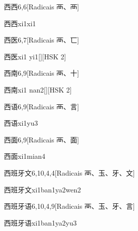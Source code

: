 \begin{entry}{西西}{6,6}[Radicais ⾑、⾑]
  \begin{phonetics}{西西}{xi1xi1}
  \end{phonetics}
\end{entry}

\begin{entry}{西医}{6,7}[Radicais ⾑、⼖]
  \begin{phonetics}{西医}{xi1 yi1}[][HSK 2]
  \end{phonetics}
\end{entry}

\begin{entry}{西南}{6,9}[Radicais ⾑、⼗]
  \begin{phonetics}{西南}{xi1 nan2}[][HSK 2]
  \end{phonetics}
\end{entry}

\begin{entry}{西语}{6,9}[Radicais ⾑、⾔]
  \begin{phonetics}{西语}{xi1yu3}
  \end{phonetics}
\end{entry}

\begin{entry}{西面}{6,9}[Radicais ⾑、⾯]
  \begin{phonetics}{西面}{xi1mian4}
  \end{phonetics}
\end{entry}

\begin{entry}{西班牙文}{6,10,4,4}[Radicais ⾑、⽟、⽛、⽂]
  \begin{phonetics}{西班牙文}{xi1ban1ya2wen2}
  \end{phonetics}
\end{entry}

\begin{entry}{西班牙语}{6,10,4,9}[Radicais ⾑、⽟、⽛、⾔]
  \begin{phonetics}{西班牙语}{xi1ban1ya2yu3}
  \end{phonetics}
\end{entry}


